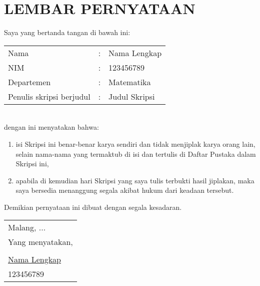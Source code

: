 \chapter*{LEMBAR PERNYATAAN}
\vspace{1cm}
Saya yang bertanda tangan di bawah ini:
\medskip \\ 
 	\begin{tabular}{llp{6cm}}
 		Nama & : & Nama Lengkap \\
 		NIM & : & 123456789 \\
 		Departemen & : & Matematika \\
 		Penulis skripsi berjudul & : & Judul Skripsi		
 	\end{tabular}
 	\\
dengan ini menyatakan bahwa:
\begin{enumerate}
	\item isi Skripsi ini benar-benar karya sendiri dan tidak menjiplak karya orang lain, selain nama-nama yang termaktub di isi dan tertulis di Daftar Pustaka dalam Skripsi ini,
	\item apabila di kemudian hari Skripsi yang saya tulis terbukti hasil jiplakan, maka saya bersedia menanggung segala akibat hukum dari keadaan tersebut.
\end{enumerate}
Demikian pernyataan ini dibuat dengan segala kesadaran.\\

\begin{flushright}
    \begin{tabular}{l}
        Malang, ...\\
	    Yang menyatakan,\\
	    \vspace{1cm}\\
	    \underline{Nama Lengkap}\\
	    123456789
    \end{tabular}
	
\end{flushright}
\cleardoublepage

